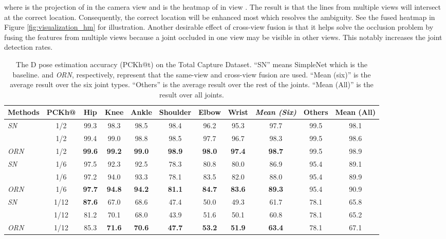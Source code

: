 \documentclass[10pt,twocolumn,letterpaper]{article}
\begin{document}
where  is the projection of  in the camera view  and  is the heatmap of  in view . The result is that the lines from multiple views will intersect at the correct location. Consequently, the correct location will be enhanced most which resolves the ambiguity. See the fused heatmap in Figure \ref{fig:visualization_hm} for illustration. Another desirable effect of cross-view fusion is that it helps solve the occlusion problem by fusing the features from multiple views because a joint occluded in one view may be visible in other views. This notably increases the joint detection rates.


\begin{table*}[]
\center
\caption{The D pose estimation accuracy (PCKh@t) on the Total Capture Dataset. ``SN'' means SimpleNet which is the baseline. 
 and \emph{ORN}, respectively, represent that the same-view and cross-view fusion are used.  ``Mean (six)'' is the average result over the six joint types. ``Others'' is the average result over the rest of the joints. ``Mean (All)'' is the result over all joints.}
\label{table:detectionrate}
\begin{tabular}{lc||ccccccc||c||c}
\toprule
      Methods & PCKh@ & Hip    & Knee   & Ankle  & Shoulder & Elbow  & Wrist & \emph{Mean (Six)} & {Others} & Mean (All) \\ \hline
\emph{SN}    & 1/2  & 99.3 & 98.3 & 98.5 & 98.4 & 96.2 & 95.3 & 97.7 & 99.5 & 98.1 \\
  & 1/2  & 99.4 & 99.0 & 98.8 & 98.5 & 97.7 & 96.7 & 98.3 & 99.5 & 98.6\\
\emph{ORN} & 1/2  & \textbf{99.6} & \textbf{99.2} & \textbf{99.0} & \textbf{98.9} & \textbf{98.0} & \textbf{97.4} & \textbf{98.7} & 99.5 & {98.9}\\ \hline
\emph{SN}    & 1/6  & 97.5 & 92.3 & 92.5 & 78.3 & 80.8 & 80.0 & 86.9 & 95.4 & 89.1\\
  & 1/6  & 97.2 & 94.0 & 93.3 & 78.1 & 83.5 & 82.0 & 88.0 & 95.4 & 89.9\\
\emph{ORN} & 1/6  & \textbf{97.7} & \textbf{94.8} & \textbf{94.2} & \textbf{81.1} & \textbf{84.7} & \textbf{83.6} & \textbf{89.3} & 95.4 & {90.9}\\ \hline
\emph{SN}    & 1/12 & \textbf{87.6} & 67.0 & 68.6 & 47.4 & 50.0 & 49.3 & 61.7 & 78.1 & 65.8\\
  & 1/12 & 81.2 & 70.1 & 68.0 & 43.9 & 51.6 & 50.1 & 60.8 & 78.1 & 65.2\\
\emph{ORN} & 1/12 & 85.3 & \textbf{71.6} & \textbf{70.6} & \textbf{47.7} & \textbf{53.2} & \textbf{51.9} & \textbf{63.4} & 78.1 & {67.1}\\
\toprule
\end{tabular}
\end{table*}
\end{document}
